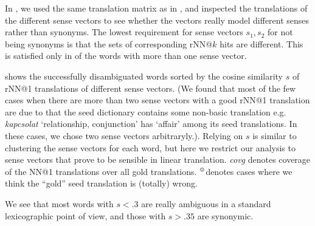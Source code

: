 \documentclass[11pt]{article}
\begin{document}
In \disamb, we used the same translation matrix as in \any, and inspected the
translations of the different sense vectors to see whether the vectors really
model different senses rather than synonyms.
The lowest requirement for sense vectors $s_1, s_2$ for not being synonyms is
that the sets of corresponding rNN@$k$ hits are different. This is satisfied
only in \todo{\%} of the words with more than one sense vector.


\newcommand{\bad}{$^\text{\frownie}$}

 shows the successfully disambiguated words sorted by the
cosine similarity $s$ of rNN@1 translations of different sense vectors. (We
found that most of the few cases when there are more than two sense vectors
with a good rNN@1 translation are due to that the seed dictionary contains some
non-basic translation e.g. \emph{kapcsolat} `relationship, conjunction' has
`affair' among its seed translations. In these cases, we chose two sense
vectors arbitraryly.).  Relying on $s$ is similar to clustering the sense vectors for
each word, but here we restrict our analysis to sense vectors that prove to be
sensible in linear translation.  \emph{covg} denotes coverage of the NN@1
translations over all gold translations.  \bad denotes cases where we think the
``gold'' seed translation is (totally) wrong.  

We see that most words with $s<.3$ are really ambiguous in a standard
lexicographic point of view, and those with $s>.35$ are synonymic.
\end{document}
